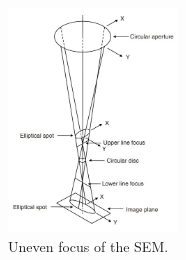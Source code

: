 \documentclass[conference]{IEEEtran}
\begin{document}
\begin{figure}[htbp]
    \centering
    \includegraphics[width=0.4\textwidth]{Images/SEM uneven focus.jpg}
    \caption{Uneven focus of the SEM.}
    \label{SEM uneven focus}
\end{figure}
\end{document}
